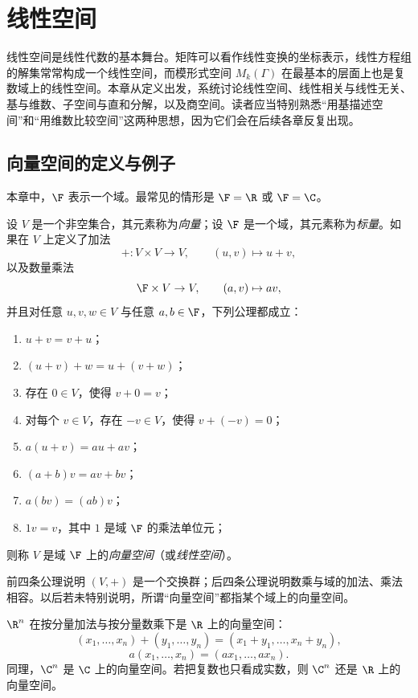 \chapter{线性空间}

线性空间是线性代数的基本舞台。矩阵可以看作线性变换的坐标表示，线性方程组的解集常常构成一个线性空间，而模形式空间 $M_k(\Gamma)$ 在最基本的层面上也是复数域上的线性空间。本章从定义出发，系统讨论线性空间、线性相关与线性无关、基与维数、子空间与直和分解，以及商空间。读者应当特别熟悉“用基描述空间”和“用维数比较空间”这两种思想，因为它们会在后续各章反复出现。

\section{向量空间的定义与例子}

本章中，$\F$ 表示一个域。最常见的情形是 $\F=\R$ 或 $\F=\C$。

\begin{definition}
设 $V$ 是一个非空集合，其元素称为\emph{向量}；设 $\F$ 是一个域，其元素称为\emph{标量}。如果在 $V$ 上定义了加法
\[
+:V\times V\to V,\qquad (u,v)\mapsto u+v,
\]
以及数量乘法
\[
\F\times V\to V,\qquad (a,v)\mapsto av,
\]
并且对任意 $u,v,w\in V$ 与任意 $a,b\in\F$，下列公理都成立：
\begin{enumerate}[label=\textnormal{(\arabic*)}]
  \item $u+v=v+u$；
  \item $(u+v)+w=u+(v+w)$；
  \item 存在 $0\in V$，使得 $v+0=v$；
  \item 对每个 $v\in V$，存在 $-v\in V$，使得 $v+(-v)=0$；
  \item $a(u+v)=au+av$；
  \item $(a+b)v=av+bv$；
  \item $a(bv)=(ab)v$；
  \item $1v=v$，其中 $1$ 是域 $\F$ 的乘法单位元；
\end{enumerate}
则称 $V$ 是域 $\F$ 上的\emph{向量空间}（或\emph{线性空间}）。
\end{definition}

\begin{remark}
前四条公理说明 $(V,+)$ 是一个交换群；后四条公理说明数乘与域的加法、乘法相容。以后若未特别说明，所谓“向量空间”都指某个域上的向量空间。
\end{remark}

\begin{example}[欧氏空间]
$\R^n$ 在按分量加法与按分量数乘下是 $\R$ 上的向量空间：
\[
(x_1,\dots,x_n)+(y_1,\dots,y_n)=(x_1+y_1,\dots,x_n+y_n),
\]
\[
a(x_1,\dots,x_n)=(ax_1,\dots,ax_n).
\]
同理，$\C^n$ 是 $\C$ 上的向量空间。若把复数也只看成实数，则 $\C^n$ 还是 $\R$ 上的向量空间。
\end{example}

